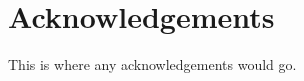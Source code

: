 \section{Acknowledgements}
This is where any acknowledgements would go.
\clearpage

\tableofcontents* %

\mainmatter

%
%
%

%
%
%
%
%





